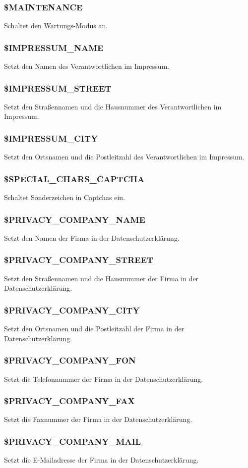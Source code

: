 \subsubsection{\$MAINTENANCE} Schaltet den Wartungs-Modus an.
\subsubsection{\$IMPRESSUM\_NAME} Setzt den Namen des Verantwortlichen im Impressum.
\subsubsection{\$IMPRESSUM\_STREET} Setzt den Straßennamen und die Hausnummer des Verantwortlichen im Impressum.
\subsubsection{\$IMPRESSUM\_CITY} Setzt den Ortsnamen und die Postleitzahl des Verantwortlichen im Impressum.
\subsubsection{\$SPECIAL\_CHARS\_CAPTCHA} Schaltet Sonderzeichen in Captchas ein.
\subsubsection{\$PRIVACY\_COMPANY\_NAME} Setzt den Namen der Firma in der Datenschutzerklärung.
\subsubsection{\$PRIVACY\_COMPANY\_STREET} Setzt den Straßennamen und die Hausnummer der Firma in der Datenschutzerklärung.
\subsubsection{\$PRIVACY\_COMPANY\_CITY} Setzt den Ortsnamen und die Postleitzahl der Firma in der Datenschutzerklärung.
\subsubsection{\$PRIVACY\_COMPANY\_FON} Setzt die Telefonnummer der Firma in der Datenschutzerklärung.
\subsubsection{\$PRIVACY\_COMPANY\_FAX} Setzt die Faxnummer der Firma in der Datenschutzerklärung.
\subsubsection{\$PRIVACY\_COMPANY\_MAIL} Setzt die E-Mailadresse der Firma in der Datenschutzerklärung.

